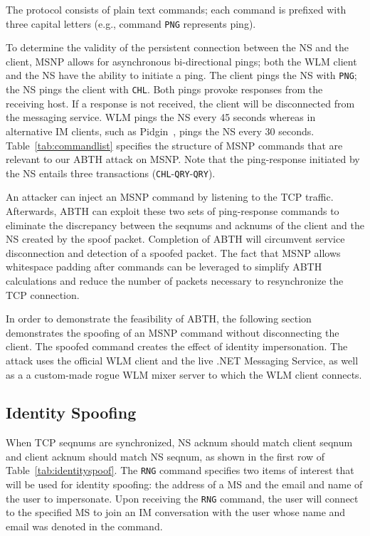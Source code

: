 \documentclass{sig-alternate}
\begin{document}
The protocol consists of plain text commands; each command is prefixed with three capital letters (e.g., command \texttt{PNG} represents ping).

To determine the validity of the persistent connection between the NS and the client, MSNP allows for asynchronous bi-directional pings; both the WLM client and the NS have the ability to initiate a ping.
The client pings the NS with \texttt{PNG}; the NS pings the client with \texttt{CHL}.
Both pings provoke responses from the receiving host. 
If a response is not received, the client will be disconnected from the messaging service.
WLM pings the NS every 45 seconds whereas in alternative IM clients, such as Pidgin~\cite{pidgin:url}, pings the NS every 30 seconds.
Table~\ref{tab:commandlist} specifies the structure of MSNP commands that are relevant to our ABTH attack on MSNP.
Note that the ping-response initiated by the NS entails three transactions (\texttt{CHL}-\texttt{QRY}-\texttt{QRY}).

An attacker can inject an MSNP command by listening to the TCP traffic.
Afterwards, ABTH can exploit these two sets of ping-response commands to eliminate the discrepancy between the seqnums and acknums of the client and the NS created by the spoof packet.
Completion of ABTH will circumvent service disconnection and detection of a spoofed packet.
The fact that MSNP allows whitespace padding after commands can be leveraged to simplify ABTH calculations and reduce the number of packets necessary to resynchronize the TCP connection.

In order to demonstrate the feasibility of ABTH, the following section demonstrates the spoofing of an MSNP command without disconnecting the client.
The spoofed command creates the effect of identity impersonation.
The attack uses the official WLM client and the live .NET Messaging Service, as well as a a custom-made rogue WLM mixer server to which the WLM client connects.

\subsection{Identity Spoofing}

When TCP seqnums are synchronized, NS acknum should match client seqnum and client acknum should match NS seqnum, as shown in the first row of Table~\ref{tab:identityspoof}.
The \texttt{RNG} command specifies two items of interest that will be used for identity spoofing: the address of a MS and the email and name of the user to impersonate.
Upon receiving the \texttt{RNG} command, the user will connect to the specified MS to join an IM conversation with the user whose name and email was denoted in the command.
\end{document}
